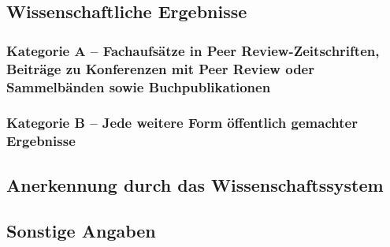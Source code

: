 \documentclass[german, 53.200]{proposal}
\begin{document}
\subsection*{Wissenschaftliche Ergebnisse}
\nocite{*}

\subsubsection*{Kategorie A -- Fachaufsätze in Peer Review-Zeitschriften, Beiträge zu Konferenzen mit Peer Review oder Sammelbänden sowie Buchpublikationen}
\printbibliography[category=reviewed, heading=none]

\subsubsection*{Kategorie B -- Jede weitere Form öffentlich gemachter Ergebnisse}
\printbibliography[category=nonreviewed, heading=none, resetnumbers=true]

\subsection*{Anerkennung durch das Wissenschaftssystem}

\subsection*{Sonstige Angaben}
\end{document}
